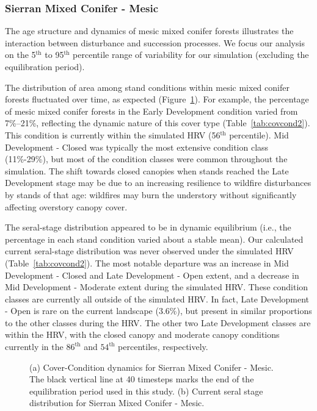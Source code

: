 \subsubsection{Sierran Mixed Conifer - Mesic}
The age structure and dynamics of mesic mixed conifer forests illustrates the interaction between disturbance and succession processes. We focus our analysis on the 5$^{\text{th}}$ to 95$^{\text{th}}$ percentile range of variability for our simulation (excluding the equilibration period). %

The distribution of area among stand conditions within mesic mixed conifer forests fluctuated over time, as expected (Figure~\ref{fig:covcond_smcm}). For example, the percentage of mesic mixed conifer forests in the Early Development condition varied from 7\%--21\%, reflecting the dynamic nature of this cover type (Table~\ref{tab:covcond2}). This condition is currently within the simulated HRV (56$^{\text{th}}$ percentile). Mid Development - Closed was typically the most extensive condition class (11\%-29\%), but most of the condition classes were common throughout the simulation. The shift towards closed canopies when stands reached the Late Development stage may be due to an increasing resilience to wildfire disturbances by stands of that age: wildfires may burn the understory without significantly affecting overstory canopy cover. %

The seral-stage distribution appeared to be in dynamic equilibrium (i.e., the percentage in each stand condition varied about a stable mean). Our calculated current seral-stage distribution was never observed under the simulated HRV (Table~\ref{tab:covcond2}). The most notable departure was an increase in Mid Development - Closed and Late Development - Open extent, and a decrease in Mid Development - Moderate extent during the simulated HRV. These condition classes are currently all outside of the simulated HRV. In fact, Late Development - Open is rare on the current landscape (3.6\%), but present in similar proportions to the other classes during the HRV. The other two Late Development classes are within the HRV, with the closed canopy and moderate canopy conditions currently in the $86^{\text{th}}$ and $54^{\text{th}}$ percentiles, respectively. 

\begin{figure}[!htbp]
  \centering
  \caption{(a) Cover-Condition dynamics for Sierran Mixed Conifer - Mesic. The black vertical line at 40 timesteps marks the end of the equilibration period used in this study. (b) Current seral stage distribution for Sierran Mixed Conifer - Mesic.} 
  \label{fig:covcond_smcm}
\end{figure}

